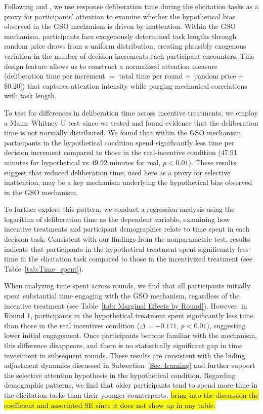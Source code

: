 \documentclass[12pt]{article}
\begin{document}
Following \citet{alos2021cognitive} and \citet{alaoui2016endogenous}, we use response deliberation time during the elicitation tasks as a proxy for participants’ attention to examine whether the hypothetical bias observed in the GSO mechanism is driven by inattention. 
Within the GSO mechanism, participants face exogenously determined task lengths through random price draws from a uniform distribution, creating plausibly exogenous variation in the number of decision increments each participant encounters. This design feature allows us to construct a normalized attention measure (deliberation time per increment $=$ total time per round ÷ [random price ÷ \$0.20]) that captures attention intensity while purging mechanical correlations with task length. 

To test for differences in deliberation time across incentive treatments, we employ a Mann–Whitney U test--since we tested and found evidence that the deliberation time is not normally distributed. We found that within the GSO mechanism, participants in the hypothetical condition spend significantly less time per decision increment compared to those in the real-incentive condition (47.91 minutes for hypothetical vs 49.92 minutes for real, \(p < 0.01\)). 
These results suggest that reduced deliberation time, used here as a proxy for selective inattention, may be a key mechanism underlying the hypothetical bias observed in the GSO mechanism.

To further explore this pattern, we conduct a regression analysis using the logarithm of deliberation time as the dependent variable, examining how incentive treatments and participant demographics relate to time spent in each decision task. Consistent with our findings from the nonparametric test,  results indicate that participants in the hypothetical treatment spent significantly less time in the elicitation task compared to those in the incentivized treatment (see  Table~\ref{tab:Time_spent}).

When analyzing time spent across rounds, we find that all participants initially spent substantial time engaging with the GSO mechanism, regardless of the incentive treatment (see Table~\ref{tab: Marginal Effects by Round}). However, in Round 1, participants in the hypothetical treatment spent significantly less time than those in the real incentives condition (\(\Delta = -0.171\), \(p < 0.01\)), suggesting lower initial engagement. Once participants become familiar with the mechanism, this difference disappears, and there is no statistically significant gap in time investment in subsequent rounds. These results are consistent with the biding adjustment dynamics discussed in Subsection~\ref{Sec: learning} and further support the selective attention hypothesis in the hypothetical condition. Regarding demographic patterns, we find that older participants tend to spend more time in the elicitation tasks than their younger counterparts.
\hl{bring into the discussion the coefficient and associated SE since it does not show up in any table.}
\end{document}
